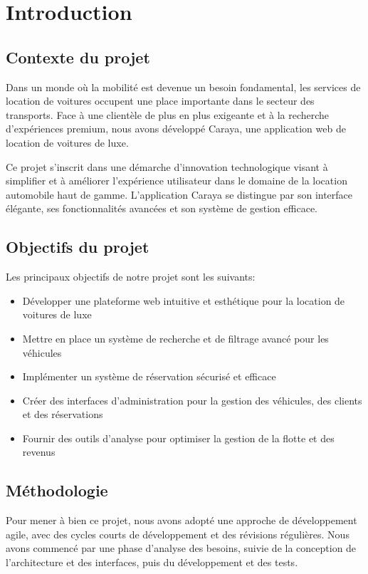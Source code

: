 \documentclass[12pt,a4paper]{report}
\begin{document}
\newpage

\chapter{Introduction}
\section{Contexte du projet}
Dans un monde où la mobilité est devenue un besoin fondamental, les services de location de voitures occupent une place importante dans le secteur des transports. Face à une clientèle de plus en plus exigeante et à la recherche d'expériences premium, nous avons développé Caraya, une application web de location de voitures de luxe.

Ce projet s'inscrit dans une démarche d'innovation technologique visant à simplifier et à améliorer l'expérience utilisateur dans le domaine de la location automobile haut de gamme. L'application Caraya se distingue par son interface élégante, ses fonctionnalités avancées et son système de gestion efficace.

\section{Objectifs du projet}
Les principaux objectifs de notre projet sont les suivants:
\begin{itemize}
    \item Développer une plateforme web intuitive et esthétique pour la location de voitures de luxe
    \item Mettre en place un système de recherche et de filtrage avancé pour les véhicules
    \item Implémenter un système de réservation sécurisé et efficace
    \item Créer des interfaces d'administration pour la gestion des véhicules, des clients et des réservations
    \item Fournir des outils d'analyse pour optimiser la gestion de la flotte et des revenus
\end{itemize}

\section{Méthodologie}
Pour mener à bien ce projet, nous avons adopté une approche de développement agile, avec des cycles courts de développement et des révisions régulières. Nous avons commencé par une phase d'analyse des besoins, suivie de la conception de l'architecture et des interfaces, puis du développement et des tests.
\end{document}
